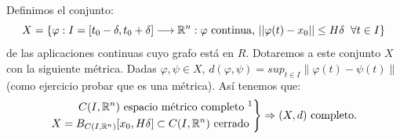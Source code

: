 \documentclass[11pt, a4paper,twoside]{article}
\makeatletter
\theoremstyle{theorem-style}  %
\renewenvironment{proof}[1][\proofname]{\par
	\pushQED{\qed}%
	\normalfont \topsep6\p@\@plus6\p@\relax
	\list{}{%
		\settowidth{\leftmargin}{\quad:\hskip\labelsep}%
		\setlength{\labelwidth}{0pt}%
		\setlength{\itemindent}{-\leftmargin}%
	}%
	\item[\hskip\labelsep\itshape#1\@addpunct{:}]\ignorespaces
}{%
	\popQED\endlist\@endpefalse
}
\theoremstyle{definition-style}
\theoremstyle{example-style}
\providecommand{\norm}[1]{\left\lVert#1\right\rVert} %
\newenvironment{rcases}
{\left.\begin{aligned}}
	{\end{aligned}\right\rbrace}
\makeatother
\begin{document}
\begin{proof}
	Definimos el conjunto:
	 \[X=\{\varphi : I=[t_0-\delta, t_0+\delta]\longrightarrow \mathbb{R}^n : \varphi \text{ continua, } ||\varphi(t)-x_0||\leq H \delta \hspace{0,2cm} \forall t \in I  \} \]
	de las aplicaciones continuas cuyo grafo está en $R$. Dotaremos a este conjunto $ X $ con la siguiente métrica. Dadas $\varphi, \psi \in X$, $d(\varphi, \psi) = sup_{t \in I} \norm{\varphi (t) - \psi (t)}$ (como ejercicio probar que es una métrica). Así tenemos que:\\
	\[\begin{rcases}
		C(I, \mathbb{R}^n) \text{ espacio métrico completo \footnotemark}\\
		X = B_{C(I, \mathbb{R}^n)} [x_0, H\delta] \subset C(I, \mathbb{R}^n) \text{ cerrado } \\
	\end{rcases} \Rightarrow (X, d) \text{ completo.}\]
	

\end{proof}
\end{document}
